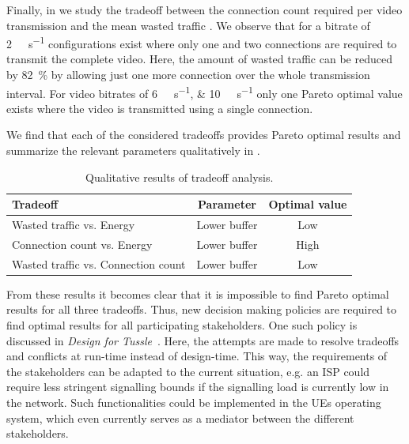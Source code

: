 Finally, in  we study the tradeoff between the connection count \connectioncount required per video transmission and the mean wasted traffic \meanwastedtraffic.
We observe that for a bitrate of \SI{2}{\mega\bit\per\second} configurations exist where only one and two connections are required to transmit the complete video.
Here, the amount of wasted traffic can be reduced by \SI{82}{\percent} by allowing just one more connection over the whole transmission interval.
For video bitrates of \SIlist{6;10}{\mega\bit\per\second} only one Pareto optimal value exists where the video is transmitted using a single connection.

We find that each of the considered tradeoffs provides Pareto optimal results and summarize the relevant parameters qualitatively in .
\begin{table}
  \centering
  \begin{tabular}{lcc}
    \toprule
    Tradeoff & Parameter & Optimal value\\
    \midrule
    Wasted traffic vs. Energy & Lower buffer & Low\\
    Connection count vs. Energy & Lower buffer & High\\
    Wasted traffic vs. Connection count & Lower buffer & Low\\
    \bottomrule
  \end{tabular}
  \caption{Qualitative results of tradeoff analysis.}
  \label{tab:application:lte_video:numerical_evaluation:trade_offs:summary}
\end{table}

From these results it becomes clear that it is impossible to find Pareto optimal results for all three tradeoffs.
Thus, new decision making policies are required to find optimal results for all participating stakeholders.
One such policy is discussed in \emph{Design for Tussle}~\cite{trilogy2008,Clark2005}.
Here, the attempts are made to resolve tradeoffs and conflicts at run-time instead of design-time.
This way, the requirements of the stakeholders can be adapted to the current situation, e.g. an \gls{ISP} could require less stringent signalling bounds if the signalling load is currently low in the network.
Such functionalities could be implemented in the \glspl{UE} operating system, which even currently serves as a mediator between the different stakeholders.